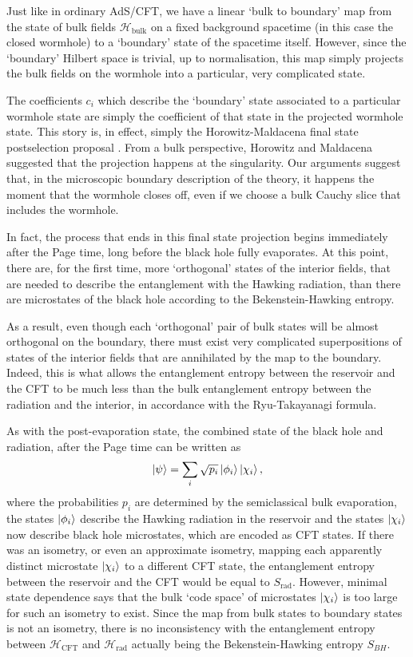 \documentclass[11pt,a4paper]{article}
\newcommand{\Srad}{S_\text{rad} }
\begin{document}
Just like in ordinary AdS/CFT, we have a linear `bulk to boundary' map from the state of bulk fields $\mathcal{H}_\text{bulk}$ on a fixed background spacetime (in this case the closed wormhole) to a `boundary' state of the spacetime itself. However, since the `boundary' Hilbert space is trivial, up to normalisation, this map simply projects the bulk fields on the wormhole into a particular, very complicated state. 

The coefficients $c_i$ which describe the `boundary' state associated to a particular wormhole state are simply the coefficient of that state in the projected wormhole state.
This story is, in effect, simply the Horowitz-Maldacena final state postselection proposal \cite{horowitz2004black}. From a bulk perspective, Horowitz and Maldacena suggested that the projection happens at the singularity. Our arguments suggest that, in the microscopic boundary description of the theory, it happens the moment that the wormhole closes off, even if we choose a bulk Cauchy slice that includes the wormhole. 

In fact, the process that ends in this final state projection begins immediately after the Page time, long before the black hole fully evaporates. At this point, there are, for the first time, more `orthogonal' states of the interior fields, that are needed to describe the entanglement with the Hawking radiation, than there are microstates of the black hole according to the Bekenstein-Hawking entropy. 

As a result, even though each `orthogonal' pair of bulk states will be almost orthogonal on the boundary, there must exist very complicated superpositions of states of the interior fields that are annihilated by the map to the boundary. Indeed, this is what allows the entanglement entropy between the reservoir and the CFT to be much less than the bulk entanglement entropy between the radiation and the interior, in accordance with the Ryu-Takayanagi formula.

As with the post-evaporation state, the combined state of the black hole and radiation, after the Page time can be written as
\begin{align}
\ket{\psi} = \sum_i \sqrt{p_i} \ket{\phi_i} \ket{\chi_i},
\end{align}
where the probabilities $p_i$ are determined by the semiclassical bulk evaporation, the states $\ket{\phi_i}$ describe the Hawking radiation in the reservoir and the states $\ket{\chi_i}$ now describe black hole microstates, which are encoded as CFT states. If there was an isometry, or even an approximate isometry, mapping each apparently distinct microstate $\ket{\chi_i}$ to a different CFT state, the entanglement entropy between the reservoir and the CFT would be equal to $\Srad$. However, minimal state dependence says that the bulk `code space' of microstates $\ket{\chi_i}$ is too large for such an isometry to exist. Since the map from bulk states to boundary states is not an isometry, there is no inconsistency with the entanglement entropy between $\mathcal{H}_\text{CFT}$ and $\mathcal{H}_\text{rad}$ actually being the Bekenstein-Hawking entropy $S_{BH}$.
\end{document}
